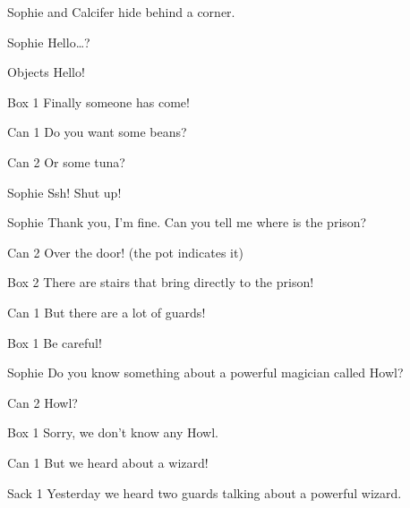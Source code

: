 \begin{screenplay}

Sophie and Calcifer hide behind a corner. 

\begin{dialogue}{Sophie}
Hello…?
\end{dialogue}
\begin{dialogue}[cheerful]{Objects}
 Hello!
\end{dialogue}
\begin{dialogue}{Box 1}
 Finally someone has come!
\end{dialogue}
\begin{dialogue}{Can 1}
 Do you want some beans?
\end{dialogue}
\begin{dialogue}{Can 2}
Or some tuna?
\end{dialogue}
\begin{dialogue}[worried]{Sophie}
Ssh! Shut up!
\end{dialogue}
\begin{dialogue}{Sophie}
Thank you, I’m fine. Can you tell me where is the prison?
\end{dialogue}
\begin{dialogue}{Can 2}
Over the door! (the pot indicates it)
\end{dialogue}
\begin{dialogue}{Box 2}
There are stairs that bring directly to the prison!
\end{dialogue}
\begin{dialogue}{Can 1}
But there are a lot of guards!
\end{dialogue}
\begin{dialogue}{Box 1}
Be careful!
\end{dialogue}
\begin{dialogue}{Sophie}
Do you know something about a powerful magician called Howl?
\end{dialogue}
\begin{dialogue}{Can 2}
Howl?
\end{dialogue}
\begin{dialogue}{Box 1}
Sorry, we don’t know any Howl.
\end{dialogue}
\begin{dialogue}{Can 1}
But we heard about a wizard!
\end{dialogue}
\begin{dialogue}{Sack 1}
Yesterday we heard two guards talking about a powerful wizard.
\end{dialogue}

\end{screenplay}
